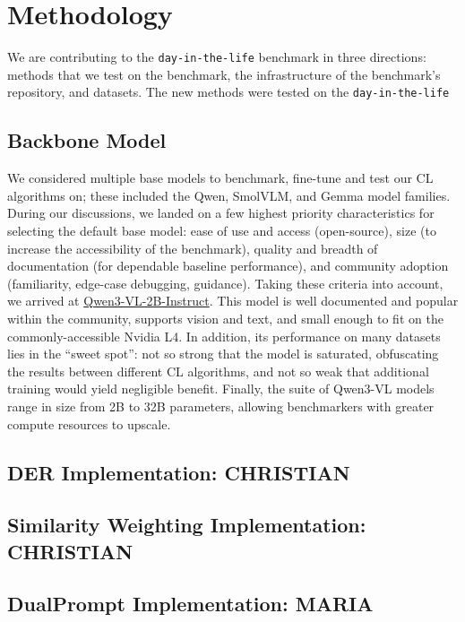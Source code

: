\documentclass{article}
\begin{document}
\section{Methodology}
We are contributing to the \texttt{day-in-the-life} benchmark in three directions: methods that we test on
the benchmark, the infrastructure of the benchmark’s repository, and datasets. The new methods were tested on
the \texttt{day-in-the-life}

\subsection{Backbone Model}
We considered multiple base models to benchmark, fine-tune and test our CL algorithms on; these included the
Qwen, SmolVLM, and Gemma model families. During our discussions, we landed on a few highest priority
characteristics for selecting the default base model: ease of use and access (open-source), size (to increase
the accessibility of the benchmark), quality and breadth of documentation (for dependable baseline
performance), and community adoption (familiarity, edge-case debugging, guidance). Taking these criteria into
account, we arrived at \href{https://huggingface.co/Qwen/Qwen3-VL-2B-Instruct}{Qwen3-VL-2B-Instruct}. This
model is well documented and popular within the community, supports vision and text, and small enough to fit
on the commonly-accessible Nvidia L4. In addition, its performance on many datasets lies in the ``sweet
spot'': not so strong that the model is saturated, obfuscating the results between different CL algorithms,
and not so weak that additional training would yield negligible benefit. Finally, the suite of Qwen3-VL
models range in size from 2B to 32B parameters, allowing benchmarkers with greater compute resources to upscale.

\subsection{DER Implementation: CHRISTIAN}

\subsection{Similarity Weighting Implementation: CHRISTIAN}

\subsection{DualPrompt Implementation: MARIA}
\end{document}
